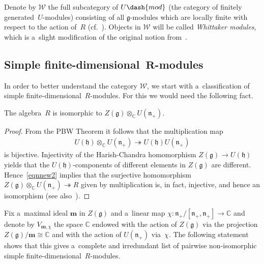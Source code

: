 \documentclass[pdftex]{sigma}
\begin{document}
Denote by $\mathscr{W}$ the full subcategory of $U\dash{mod}$ (the category of f\/initely generated~$U$-modules)
consisting of all $\mathfrak{g}$-modules which are locally f\/inite with respect to the action of~$R$ (cf.~\cite[Definition~1.5]{McD}).
Objects in $\mathscr{W}$ will be called {\em Whittaker modules}, which is a~slight modif\/ication of the original notion
from~\cite{Ko}.

\subsection[Simple f\/inite-dimensional~$R$-modules]{Simple f\/inite-dimensional~$\boldsymbol{R}$-modules}%

In order to better understand the category $\mathscr{W}$, we start with a~classif\/ication of simple f\/inite-dimensional~$R$-modules.
For this we would need the following fact.

\begin{proposition}
\label{prop21}
The algebra~$R$ is isomorphic to $Z(\mathfrak{g})\otimes_{\mathbb{C}}U(\mathfrak{n}_+)$.
\end{proposition}

\begin{proof}
From the PBW Theorem it follows that the multiplication map
\begin{gather}
\label{eqnnew2}
U(\mathfrak{h})\otimes_{\mathbb{C}}U(\mathfrak{n}_+)\twoheadrightarrow U(\mathfrak{h})U(\mathfrak{n}_+)
\end{gather}
is bijective.
Injectivity of the Harish-Chandra homomorphism $Z(\mathfrak{g})\to U(\mathfrak{h})$ yields that the
$U(\mathfrak{h})$-components of dif\/ferent elements in $Z(\mathfrak{g})$ are dif\/ferent.
Hence~\eqref{eqnnew2} implies that the surjective homomorphism
$Z(\mathfrak{g})\otimes_{\mathbb{C}}U(\mathfrak{n}_+)\twoheadrightarrow R$ given by multiplication is, in fact,
injective, and hence an isomorphism (see also~\cite[Section~3.3]{Ko}).
\end{proof}

Fix a~maximal ideal $\mathbf{m}$ in $Z(\mathfrak{g})$ and a~linear map
$\chi:\mathfrak{n}_+/[\mathfrak{n}_+,\mathfrak{n}_+]\to\mathbb{C}$ and denote by $V_{\mathbf{m},\chi}$ the space
$\mathbb{C}$ endowed with the action of $Z(\mathfrak{g})$ via the projection $Z(\mathfrak{g})/\mathbf{m}\cong
\mathbb{C}$ and with the action of $U(\mathfrak{n}_+)$ via~$\chi$.
The following statement shows that this gives a~complete and irredundant list of pairwise non-isomorphic simple f\/inite-dimensional~$R$-modules.
\end{document}
